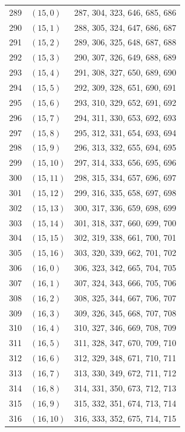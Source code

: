 \documentclass{article}
\begin{document}
\begin{longtable}{lll}
  289 & \((15, 0)\) & 287, 304, 323, 646, 685, 686 \\
  290 & \((15, 1)\) & 288, 305, 324, 647, 686, 687 \\
  291 & \((15, 2)\) & 289, 306, 325, 648, 687, 688 \\
  292 & \((15, 3)\) & 290, 307, 326, 649, 688, 689 \\
  293 & \((15, 4)\) & 291, 308, 327, 650, 689, 690 \\
  294 & \((15, 5)\) & 292, 309, 328, 651, 690, 691 \\
  295 & \((15, 6)\) & 293, 310, 329, 652, 691, 692 \\
  296 & \((15, 7)\) & 294, 311, 330, 653, 692, 693 \\
  297 & \((15, 8)\) & 295, 312, 331, 654, 693, 694 \\
  298 & \((15, 9)\) & 296, 313, 332, 655, 694, 695 \\
  299 & \((15, 10)\) & 297, 314, 333, 656, 695, 696 \\
  300 & \((15, 11)\) & 298, 315, 334, 657, 696, 697 \\
  301 & \((15, 12)\) & 299, 316, 335, 658, 697, 698 \\
  302 & \((15, 13)\) & 300, 317, 336, 659, 698, 699 \\
  303 & \((15, 14)\) & 301, 318, 337, 660, 699, 700 \\
  304 & \((15, 15)\) & 302, 319, 338, 661, 700, 701 \\
  305 & \((15, 16)\) & 303, 320, 339, 662, 701, 702 \\
  306 & \((16, 0)\) & 306, 323, 342, 665, 704, 705 \\
  307 & \((16, 1)\) & 307, 324, 343, 666, 705, 706 \\
  308 & \((16, 2)\) & 308, 325, 344, 667, 706, 707 \\
  309 & \((16, 3)\) & 309, 326, 345, 668, 707, 708 \\
  310 & \((16, 4)\) & 310, 327, 346, 669, 708, 709 \\
  311 & \((16, 5)\) & 311, 328, 347, 670, 709, 710 \\
  312 & \((16, 6)\) & 312, 329, 348, 671, 710, 711 \\
  313 & \((16, 7)\) & 313, 330, 349, 672, 711, 712 \\
  314 & \((16, 8)\) & 314, 331, 350, 673, 712, 713 \\
  315 & \((16, 9)\) & 315, 332, 351, 674, 713, 714 \\
  316 & \((16, 10)\) & 316, 333, 352, 675, 714, 715 \\

\end{longtable}
\end{document}
